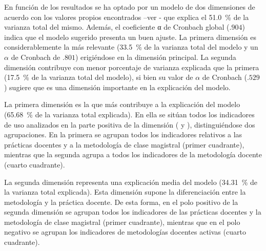 \documentclass[spanish]{textolivre}
\begin{document}
En función de los resultados se ha optado por un modelo de dos dimensiones de acuerdo con los valores propios encontrados –ver - que explica el 51.0~\% de la varianza total del mismo. Además, el coeficiente α de Cronbach global ($.904$) indica que el modelo sugerido presenta un buen ajuste. La primera dimensión es considerablemente la más relevante (33.5~\% de la varianza total del modelo y un $\alpha$ de Cronbach de $.801$) erigiéndose en la dimensión principal. La segunda dimensión contribuye con menor porcentaje de varianza explicada que la primera (17.5~\% de la varianza total del modelo), si bien su valor de $\alpha$ de Cronbach ($.529$) sugiere que es una dimensión importante en la explicación del modelo.

La primera dimensión es la que más contribuye a la explicación del modelo (65.68~\% de la varianza total explicada). En ella se sitúan todos los indicadores de uso analizados en la parte positiva de la dimensión ( y ), distinguiéndose dos agrupaciones. En la primera se agrupan todos los indicadores relativos a las prácticas docentes y a la metodología de clase magistral (primer cuadrante), mientras que la segunda agrupa a todos los indicadores de la metodología docente (cuarto cuadrante).

La segunda dimensión representa una explicación media del modelo (34.31~\% de la varianza total explicada). Esta dimensión supone la diferenciación entre la metodología y la práctica docente. De esta forma, en el polo positivo de la segunda dimensión se agrupan todos los indicadores de las prácticas docentes y la metodología de clase magistral (primer cuadrante), mientras que en el polo negativo se agrupan los indicadores de metodologías docentes activas (cuarto cuadrante).
\end{document}
